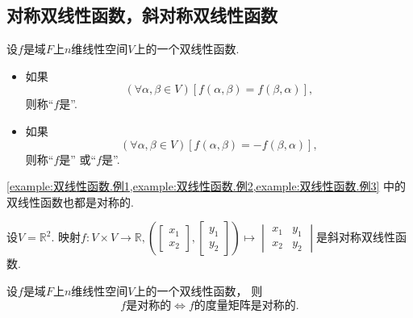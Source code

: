 \subsection{对称双线性函数，斜对称双线性函数}
\begin{definition}
设\(f\)是域\(F\)上\(n\)维线性空间\(V\)上的一个双线性函数.
\begin{itemize}
	\item 如果\begin{equation}
		(\forall \alpha,\beta \in V)
		[f(\alpha,\beta) = f(\beta,\alpha)],
	\end{equation}
	则称“\(f\)是”.
	\item 如果\begin{equation}
		(\forall \alpha,\beta \in V)
		[f(\alpha,\beta) = -f(\beta,\alpha)],
	\end{equation}
	则称“\(f\)是”
	或“\(f\)是”.
\end{itemize}
\end{definition}

\cref{example:双线性函数.例1,example:双线性函数.例2,example:双线性函数.例3} 中的双线性函数也都是对称的.

\begin{example}
设\(V = \mathbb{R}^2\).
映射\(f\colon V \times V \to \mathbb{R},
\left(
	\begin{bmatrix}
		x_1 \\
		x_2
	\end{bmatrix},
	\begin{bmatrix}
		y_1 \\
		y_2
	\end{bmatrix}
\right)
\mapsto
\begin{vmatrix}
	x_1 & y_1 \\
	x_2 & y_2
\end{vmatrix}\)是斜对称双线性函数.
\end{example}

\begin{proposition}
设\(f\)是域\(F\)上\(n\)维线性空间\(V\)上的一个双线性函数，
则\begin{equation*}
	\text{$f$是对称的}
	\iff
	\text{$f$的度量矩阵是对称的}.
\end{equation*}
\end{proposition}

